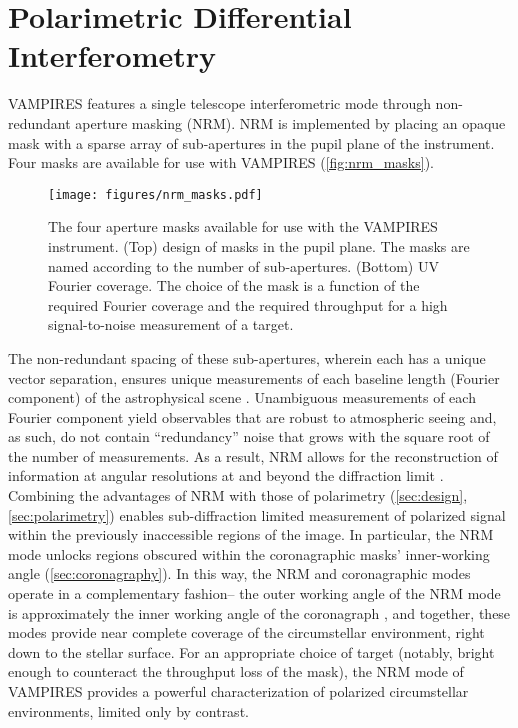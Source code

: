 \section{Polarimetric Differential Interferometry}\label{sec:interferometry}


 
 

VAMPIRES features a single telescope interferometric mode through non-redundant aperture masking (NRM). NRM is implemented by placing an opaque mask with a sparse array of sub-apertures in the pupil plane of the instrument. Four masks are available for use with VAMPIRES (\autoref{fig:nrm_masks}).


\begin{figure*}[t]
    \centering
    \texttt{[image: figures/nrm\_masks.pdf]}
    \caption{The four aperture masks available for use with the VAMPIRES instrument. (Top) design of masks in the pupil plane. The masks are named according to the number of sub-apertures. (Bottom) UV Fourier coverage. The choice of the mask is a function of the required Fourier coverage and the required throughput for a high signal-to-noise measurement of a target. \label{fig:nrm_masks}}
\end{figure*}

The non-redundant spacing of these sub-apertures, wherein each has a unique vector separation, ensures unique measurements of each baseline length (Fourier component) of the astrophysical scene \citep{tuthill_aperture_2000}. Unambiguous measurements of each Fourier component yield observables that are robust to atmospheric seeing and, as such, do not contain ``redundancy'' noise that grows with the square root of the number of measurements. As a result, NRM allows for the reconstruction of information at angular resolutions at and beyond the diffraction limit \citep{labeyrie_introduction_2014}. Combining the advantages of NRM with those of polarimetry (\autoref{sec:design}, \autoref{sec:polarimetry}) enables sub-diffraction limited measurement of polarized signal within the previously inaccessible regions of the image. In particular, the NRM mode unlocks regions obscured within the coronagraphic masks' inner-working angle (\autoref{sec:coronagraphy}). In this way, the NRM and coronagraphic modes operate in a complementary fashion-- the outer working angle of the NRM mode is approximately the inner working angle of the coronagraph \citep{norris_vampires_2015}, and together, these modes provide near complete coverage of the circumstellar environment, right down to the stellar surface. For an appropriate choice of target (notably, bright enough to counteract the throughput loss of the mask), the NRM mode of VAMPIRES provides a powerful characterization of polarized circumstellar environments, limited only by contrast. 


